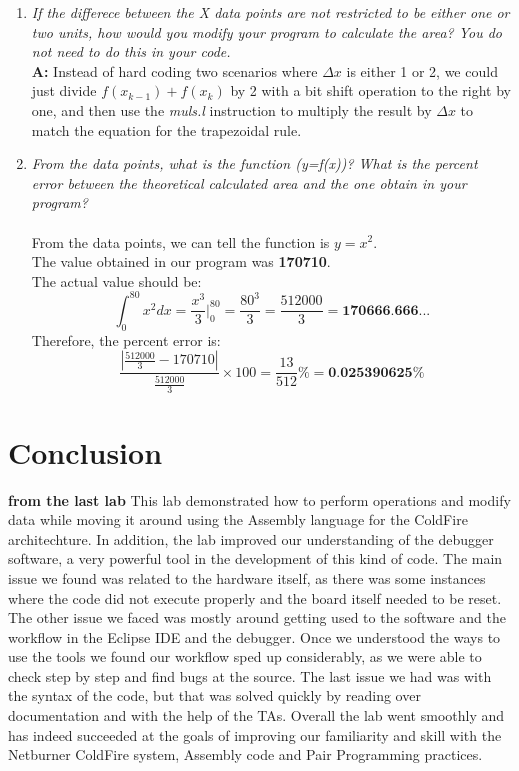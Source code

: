 \documentclass[letterpaper]{article}
\begin{document}
\begin{enumerate}
    \item \textit{If the differece between the X data points are not restricted to be either one
                  or two units, how would you modify your program to calculate the area? You do
                  not need to do this in your code.}\\
          \textbf{A: }
          Instead of hard coding two scenarios where $\Delta x$ is either 1 or 2,
          we could just divide $f(x_{k-1})+f(x_k)$ by 2 with a bit shift operation
          to the right by one, and then use the \textit{muls.l} instruction
          to multiply the result by $\Delta x$ to match the equation for the trapezoidal rule.
    \item \textit{From the data points, what is the function (y=f(x))? What is the percent error between the
                  theoretical calculated area and the one obtain in your program?}\\
          \\From the data points, we can tell the function is $y=x^2$.\\
          The value obtained in our program was \textbf{170710}.\\
          The actual value should be:\\
          $$\int_0^{80} x^2 dx = \frac{x^3}{3}\Big|_0^{80} = \frac{80^3}{3} = \frac{512000}{3}= \textbf{170666.666...} $$
          Therefore, the percent error is:
          $$\frac{|\frac{512000}{3}-170710|}{\frac{512000}{3}}\times 100 = \frac{13}{512}\% = \textbf{0.025390625\%}$$

  \end{enumerate}

\section{Conclusion}
\textbf{from the last lab}
This lab demonstrated how to perform operations and modify data while
moving it around using the Assembly language for the ColdFire architechture. In
addition, the lab improved our understanding of the debugger software, a very
powerful tool in the development of this kind of code.  The main issue we found
was related to the hardware itself, as there was some instances where the code
did not execute properly and the board itself needed to be reset.  The other
issue we faced was mostly around getting used to the software and the workflow
in the Eclipse IDE and the debugger.  Once we understood the ways to use the
tools we found our workflow sped up considerably, as we were able to check step
by step and find bugs at the source.  The last issue we had was with the syntax
of the code, but that was solved quickly by reading over documentation and with
the help of the TAs.  Overall the lab went smoothly and has indeed succeeded at
the goals of improving our familiarity and skill with the Netburner ColdFire
system, Assembly code and Pair Programming practices.
\end{document}
